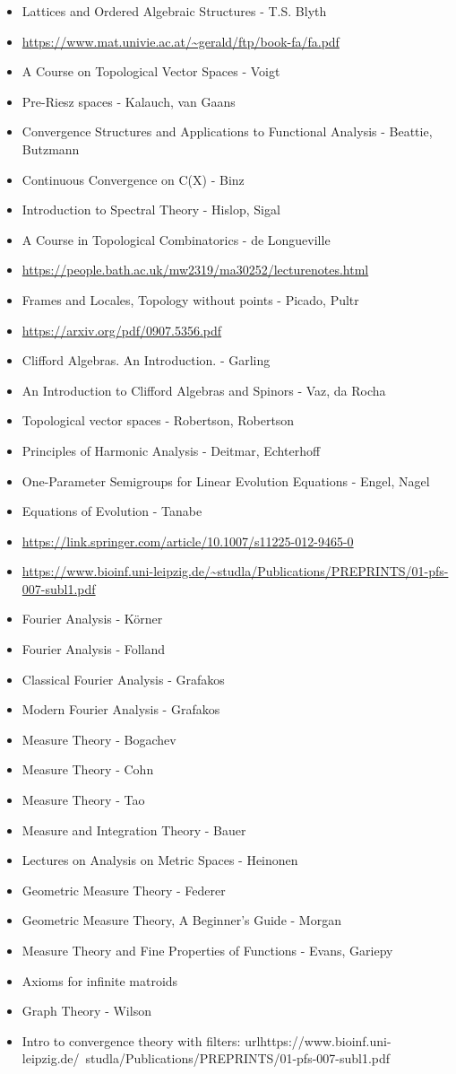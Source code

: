 \documentclass{report}
\begin{document}
\begin{itemize}
\item Lattices and Ordered Algebraic Structures - T.S. Blyth
\item \url{https://www.mat.univie.ac.at/~gerald/ftp/book-fa/fa.pdf}
\item A Course on Topological Vector Spaces - Voigt
\item Pre-Riesz spaces - Kalauch, van Gaans
\item Convergence Structures and Applications to Functional Analysis - Beattie, Butzmann
\item Continuous Convergence on C(X) - Binz
\item Introduction to Spectral Theory - Hislop, Sigal
\item A Course in Topological Combinatorics - de Longueville
\item \url{https://people.bath.ac.uk/mw2319/ma30252/lecturenotes.html}
\item Frames and Locales, Topology without points - Picado, Pultr
\item \url{https://arxiv.org/pdf/0907.5356.pdf}
\item Clifford Algebras. An Introduction. - Garling
\item An Introduction to Clifford Algebras and Spinors - Vaz, da Rocha
\item Topological vector spaces - Robertson, Robertson
\item Principles of Harmonic Analysis - Deitmar, Echterhoff
\item One-Parameter Semigroups for Linear Evolution Equations - Engel, Nagel
\item Equations of Evolution - Tanabe
\item \url{https://link.springer.com/article/10.1007/s11225-012-9465-0}
\item \url{https://www.bioinf.uni-leipzig.de/~studla/Publications/PREPRINTS/01-pfs-007-subl1.pdf}
\item Fourier Analysis - Körner
\item Fourier Analysis - Folland
\item Classical Fourier Analysis - Grafakos
\item Modern Fourier Analysis - Grafakos
\item Measure Theory - Bogachev
\item Measure Theory - Cohn
\item Measure Theory - Tao
\item Measure and Integration Theory - Bauer
\item Lectures on Analysis on Metric Spaces - Heinonen
\item Geometric Measure Theory - Federer
\item Geometric Measure Theory, A Beginner's Guide - Morgan
\item Measure Theory and Fine Properties of Functions - Evans, Gariepy
\item Axioms for infinite matroids
\item Graph Theory - Wilson
\item Intro to convergence theory with filters: 
url{https://www.bioinf.uni-leipzig.de/~studla/Publications/PREPRINTS/01-pfs-007-subl1.pdf}
\end{itemize}

\printbibliography
\end{document}
